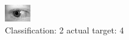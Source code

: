 \begin{figure}[h!]
\begin{center}
\includegraphics[width=0.60\columnwidth]{figures/ID796_class_2_target_4.png}
\end{center}
\caption{ Classification: 2 actual target: 4}
\label{fig:ID796_class_2_target_4}
\end{figure}

